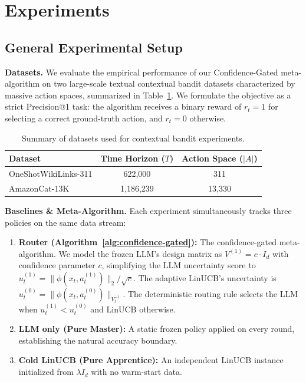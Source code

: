 
\section{Experiments}
\label{sec:experiments}

\subsection{General Experimental Setup}

\textbf{Datasets.} We evaluate the empirical performance of our Confidence-Gated meta-algorithm on two large-scale textual contextual bandit datasets characterized by massive action spaces, summarized in Table~\ref{tab:datasets}. We formulate the objective as a strict Precision@1 task: the algorithm receives a binary reward of $r_t = 1$ for selecting a correct ground-truth action, and $r_t = 0$ otherwise.

\begin{table}[h]
\centering
\caption{Summary of datasets used for contextual bandit experiments.}
\label{tab:datasets}
\begin{tabular}{@{}lcc@{}}
\toprule
\textbf{Dataset} & \textbf{Time Horizon ($T$)} & \textbf{Action Space ($|A|$)} \\ \midrule
OneShotWikiLinks-311 & 622,000 & 311 \\
AmazonCat-13K & 1,186,239 & 13,330 \\ \bottomrule
\end{tabular}
\end{table}

\textbf{Baselines \& Meta-Algorithm.} Each experiment simultaneously tracks three policies on the same data stream:
\begin{enumerate}[nosep]
    \item \textbf{Router (Algorithm~\ref{alg:confidence-gated}):} The confidence-gated meta-algorithm. We model the frozen LLM's design matrix as $V^{(1)} = c \cdot I_d$ with confidence parameter $c$, simplifying the LLM uncertainty score to $u_t^{(1)} = \|\phi(x_t, a_t^{(1)})\|_2 / \sqrt{c}$. The adaptive LinUCB's uncertainty is $u_t^{(0)} = \|\phi(x_t, a_t^{(0)})\|_{V_t^{-1}}$. The deterministic routing rule selects the LLM when $u_t^{(1)} < u_t^{(0)}$ and LinUCB otherwise.
    \item \textbf{LLM only (Pure Master):} A static frozen policy applied on every round, establishing the natural accuracy boundary.
    \item \textbf{Cold LinUCB (Pure Apprentice):} An independent LinUCB instance initialized from $\lambda I_d$ with no warm-start data.
\end{enumerate}

